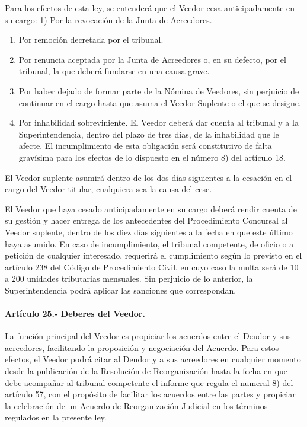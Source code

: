 \documentclass[
]{book}
\begin{document}
Para los efectos de esta ley, se entenderá que el Veedor cesa anticipadamente en su cargo:
1) Por la revocación de la Junta de Acreedores.

\begin{enumerate}
\def\labelenumi{\arabic{enumi})}
\setcounter{enumi}{1}
\item
  Por remoción decretada por el tribunal.
\item
  Por renuncia aceptada por la Junta de Acreedores o, en su defecto, por el tribunal, la que deberá fundarse en una causa grave.
\item
  Por haber dejado de formar parte de la Nómina de Veedores, sin perjuicio de continuar en el cargo hasta que asuma el Veedor Suplente o el que se designe.
\item
  Por inhabilidad sobreviniente. El Veedor deberá dar cuenta al tribunal y a la Superintendencia, dentro del plazo de tres días, de la inhabilidad que le afecte. El incumplimiento de esta obligación será constitutivo de falta gravísima para los efectos de lo dispuesto en el número 8) del artículo 18.
\end{enumerate}

El Veedor suplente asumirá dentro de los dos días siguientes a la cesación en el cargo del Veedor titular, cualquiera sea la causa del cese.

El Veedor que haya cesado anticipadamente en su cargo deberá rendir cuenta de su gestión y hacer entrega de los antecedentes del Procedimiento Concursal al Veedor suplente, dentro de los diez días siguientes a la fecha en que este último haya asumido. En caso de incumplimiento, el tribunal competente, de oficio o a petición de cualquier interesado, requerirá el cumplimiento según lo previsto en el artículo 238 del Código de Procedimiento Civil, en cuyo caso la multa será de 10 a 200 unidades tributarias mensuales. Sin perjuicio de lo anterior, la Superintendencia podrá aplicar las sanciones que correspondan.

\hypertarget{artuxedculo-25.--deberes-del-veedor.}{%
\paragraph*{Artículo 25.- Deberes del Veedor.}\label{artuxedculo-25.--deberes-del-veedor.}}

La función principal del Veedor es propiciar los acuerdos entre el Deudor y sus acreedores, facilitando la proposición y negociación del Acuerdo. Para estos efectos, el Veedor podrá citar al Deudor y a sus acreedores en cualquier momento desde la publicación de la Resolución de Reorganización hasta la fecha en que debe acompañar al tribunal competente el informe que regula el numeral 8) del artículo 57, con el propósito de facilitar los acuerdos entre las partes y propiciar la celebración de un Acuerdo de Reorganización Judicial en los términos regulados en la presente ley.
\end{document}
